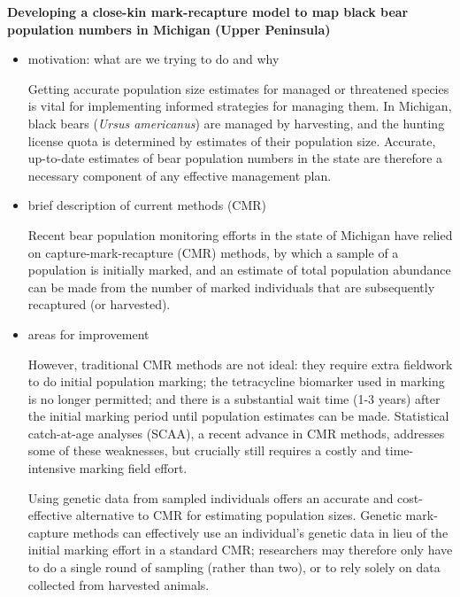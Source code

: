 \documentclass[12pt]{article}
\begin{document}
%
\begin{center}
\textbf{Developing a close-kin mark-recapture model to map black bear population numbers in Michigan (Upper Peninsula)}
\end{center}
%            
\begin{itemize}
\item motivation: what are we trying to do and why

Getting accurate population size estimates 
for managed or threatened species  
is vital for implementing informed strategies for managing them.
In Michigan, black bears (\textit{Ursus americanus}) 
are managed by harvesting, 
and the hunting license quota is determined by 
estimates of their population size.
Accurate, up-to-date estimates of 
bear population numbers in the state 
are therefore a necessary component 
of any effective management plan.

\item brief description of current methods (CMR)

Recent bear population monitoring efforts 
in the state of Michigan have relied on 
capture-mark-recapture (CMR) methods, 
by which a sample of a population is initially marked, 
and an estimate of total population abundance 
can be made from the number of marked individuals 
that are subsequently recaptured (or harvested). 

\item areas for improvement

However, traditional CMR methods are not ideal:  
they require extra fieldwork to do initial population marking; 
the tetracycline biomarker used in marking is no longer permitted; 
and there is a substantial wait time (1-3 years) after the 
initial marking period until population estimates can be made.
Statistical catch-at-age analyses (SCAA), 
a recent advance in CMR methods, 
addresses some of these weaknesses, 
but crucially still requires a costly and time-intensive 
marking field effort.

Using genetic data from sampled individuals 
offers an accurate and cost-effective alternative to CMR 
for estimating population sizes. 
Genetic mark-capture methods can effectively use 
an individual's genetic data in lieu of 
the initial marking effort in a standard CMR; 
researchers may therefore 
only have to do a single round of sampling 
(rather than two), 
or to rely solely on data collected from harvested animals.


\end{itemize}
\end{document}
